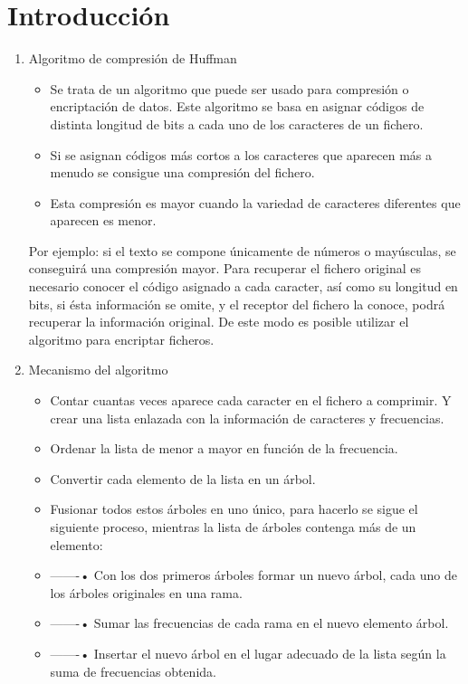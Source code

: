 \documentclass{article}
\begin{document}
  \section{Introducción}
  \begin{enumerate}
    \item Algoritmo de compresión de Huffman
    \begin{itemize}
      \item Se trata de un algoritmo que puede ser usado para compresión o encriptación de datos. Este algoritmo 
      se basa en asignar códigos de distinta longitud de bits a cada uno de los caracteres de un fichero. 
      \item Si se asignan códigos más cortos a los caracteres que aparecen más a menudo se consigue una compresión del fichero.
      \item Esta compresión es mayor cuando la variedad de caracteres diferentes que aparecen es menor.
    \end{itemize}
    Por ejemplo: si el texto se compone  únicamente de números o mayúsculas, se conseguirá una compresión mayor.
    Para recuperar el fichero original es necesario conocer el código asignado a cada caracter, así como su longitud en bits, 
    si  ésta información se omite, y el receptor del fichero la conoce, podrá recuperar la información original. De este modo 
    es posible utilizar el algoritmo para encriptar ficheros.
    \item Mecanismo del algoritmo
    \begin{itemize}
      \item Contar cuantas veces aparece cada caracter en el fichero a comprimir. Y crear una lista enlazada con la 
      información de caracteres y frecuencias.
      \item Ordenar la lista de menor a mayor en función de la frecuencia.
      \item Convertir cada elemento de la lista en un árbol.
      \item Fusionar todos estos  árboles en uno  único, para hacerlo se sigue el siguiente proceso, mientras la lista de 
      árboles contenga más de un elemento:
      \item -------• Con los dos primeros árboles formar un nuevo  árbol, cada uno de los  árboles originales en una rama.
      \item -------• Sumar las frecuencias de cada rama en el nuevo elemento árbol.
      \item -------• Insertar el nuevo  árbol en el lugar adecuado de la lista según la suma de frecuencias obtenida.

\end{itemize}
\end{enumerate}
\end{document}
